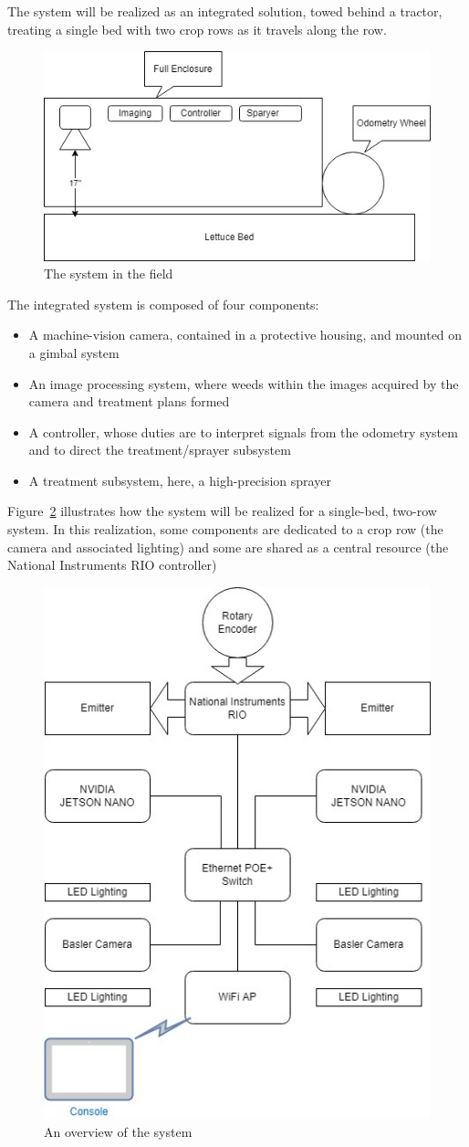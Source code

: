 \documentclass[letterpaper]{article}
\begin{document}
{{The system will be realized as an integrated solution, towed behind a tractor, treating a single bed with two crop rows as it travels along the row.
\begin{figure}[H]
	\centering
	\includegraphics[width=0.4\linewidth]{./figures/system-in-field.jpg}
	\caption{The system in the field}
	\label{fig:system-in-field}
\end{figure}

The integrated system is composed of four components:
\begin{itemize}
\item{A machine-vision camera, contained in a protective housing, and mounted on a gimbal system}
\item{An image processing system, where weeds within the images acquired by the camera and treatment plans formed}
\item{A controller, whose duties are to interpret signals from the odometry system and to direct the treatment/sprayer subsystem}
\item{A treatment subsystem, here, a high-precision sprayer}
\end{itemize}

Figure~\ref{fig:system-overview} illustrates how the system will be realized for a single-bed, two-row system. In this realization, some components are dedicated to a crop row (the camera and associated lighting) and some are shared as a central resource (the National Instruments RIO controller)
\begin{figure}[H]
	\centering
	\includegraphics[width=0.4\linewidth]{./figures/system-overview.jpg}
	\caption{An overview of the system}
	\label{fig:system-overview}
\end{figure}
}}
\end{document}

